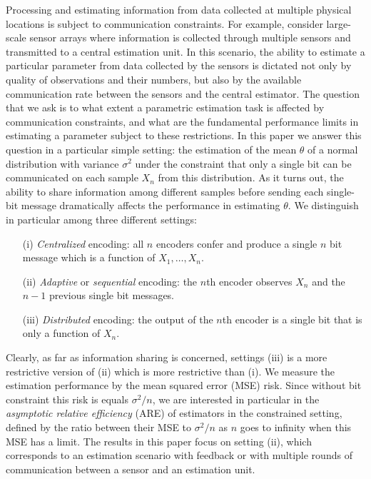 \documentclass[letterpaper, conference]{IEEEtran}      %
\begin{document}
Processing and estimating information from data collected at multiple physical locations is subject to communication constraints. 
For example, consider large-scale sensor arrays where information is collected through multiple sensors and transmitted to a central estimation unit. In this scenario, the ability to estimate a particular parameter from data collected by the sensors is dictated not only by quality of observations and their numbers, but also by the available communication rate between the sensors and the central estimator. The question that we ask is to what extent a parametric estimation task is affected by communication constraints, and what are the fundamental performance limits in estimating a parameter subject to these restrictions. In this paper we answer this question in a particular simple setting: the estimation of the mean $\theta$ of a normal distribution with variance $\sigma^2$ under the constraint that only a single bit can be communicated on each sample $X_n$ from this distribution. As it turns out, the ability to share information among different samples before sending each single-bit message dramatically affects the performance in estimating $\theta$. We distinguish in particular among three different settings:
 \begin{itemize}
 \item[(i)] \emph{Centralized} encoding: all $n$ encoders confer and produce a single $n$ bit message which is a function of $X_1,\ldots,X_n$. 
 \item[(ii)] \emph{Adaptive} or \emph{sequential} encoding: the $n$th encoder observes $X_n$ and the $n-1$ previous single bit messages.
 \item[(iii)] \emph{Distributed} encoding: the output of the $n$th encoder is a single bit that is only a function of $X_n$.
 \end{itemize}
Clearly, as far as information sharing is concerned, settings (iii) is a more restrictive version of (ii) which is more restrictive than (i). We measure the estimation performance by the mean squared error (MSE) risk. Since without bit constraint this risk is equals $\sigma^2/n$, we are interested in particular in the \emph{asymptotic relative efficiency} (ARE) of estimators in the constrained setting, defined by the ratio between their MSE to $\sigma^2/n$ as $n$ goes to infinity when this MSE has a limit. The results in this paper focus on setting (ii), which corresponds to an estimation scenario with feedback or with multiple rounds of communication between a sensor and an estimation unit. \\%
\end{document}
